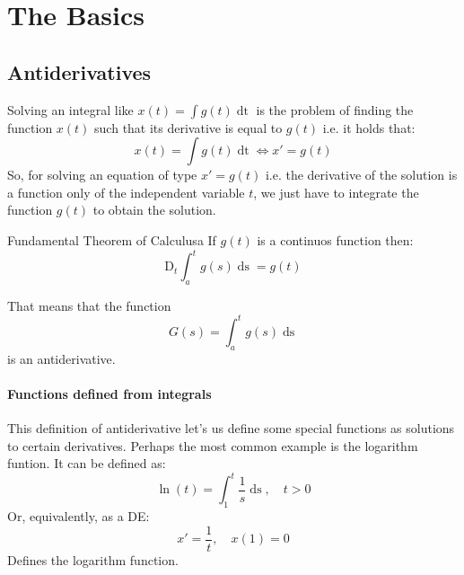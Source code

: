 \documentclass[../ode.tex]{subfiles}
\begin{document}
    \chapter{\sffamily The Basics}

    \section{\sffamily Antiderivatives}
    Solving an integral like $x(t) = \int g(t) \mathop{\mathrm{d}t} $ is the problem of finding the function $x(t)$ such that its
    derivative is equal to $g(t)$ i.e. it holds that:
    \begin{equation*}
        x(t) = \int g(t) \mathop{\mathrm{d}t} \iff x' = g(t)    
    \end{equation*}
    So, for solving an equation of type $x' = g(t)$ i.e. the derivative of the solution is a function only of the independent
    variable $t$, we just have to integrate the function $g(t)$ to obtain the solution.

    \hfill
    \begin{thm}{Fundamental Theorem of Calculus}{a}
        If $g(t)$ is a continuos function then:
        \begin{equation}\label{funthcal}
            \mathrm{D}_{t} \int_{a}^{t} g(s) \mathop{\mathrm{d}s} = g(t)
        \end{equation}
    \end{thm}
    That means that the function 
    \begin{equation*}
        G(s) = \int_{a}^{t} g(s) \mathop{\mathrm{d}s} 
    \end{equation*}
    is an antiderivative. 
    \subsubsection{\sffamily Functions defined from integrals}
    This definition of antiderivative let's us define some special functions as solutions to certain derivatives. Perhaps the most
    common example is the logarithm funtion. It can be defined as:
    \begin{equation*}
        \ln(t) = \int_{1}^{t} \frac{1}{s}\mathop{\mathrm{d}s} , \quad t>0
    \end{equation*}
    Or, equivalently, as a DE:
    \begin{equation*}
        x' = \frac{1}{t}, \quad x(1) = 0 
    \end{equation*}
    Defines the logarithm function.
\end{document}
